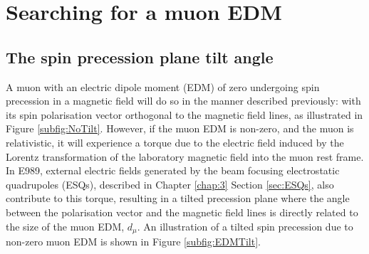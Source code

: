 \section{Searching for a muon EDM}

\subsection{The spin precession plane tilt angle}

A muon with an electric dipole moment (EDM) of zero undergoing spin precession in a magnetic field will do so in the manner described previously: with its spin polarisation vector orthogonal to the magnetic field lines, as illustrated in Figure \ref{subfig:NoTilt}. However, if the muon EDM is non-zero, and the muon is relativistic, it will experience a torque due to the electric field induced by the Lorentz transformation of the laboratory magnetic field into the muon rest frame. In E989, external electric fields generated by the beam focusing electrostatic quadrupoles (ESQs), described in Chapter \ref{chap:3} Section \ref{sec:ESQs}, also contribute to this torque, resulting in a tilted precession plane where the angle between the polarisation vector and the magnetic field lines is directly related to the size of the muon EDM, $d_{\mu}$. An illustration of a tilted spin precession due to non-zero muon EDM is shown in Figure \ref{subfig:EDMTilt}.

